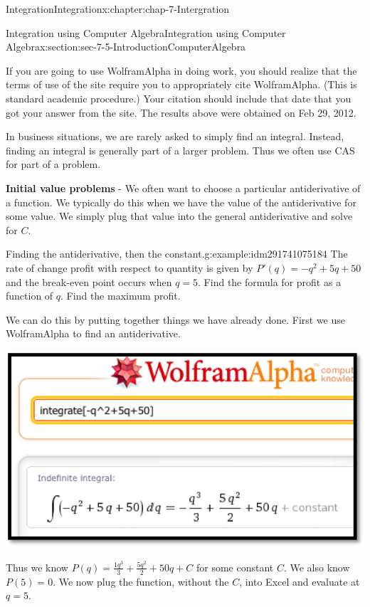 \documentclass[oneside,10pt,]{book}
\newcommand{\terminology}[1]{\textbf{#1}}
\numberwithin{equation}{section}
\begin{document}
\begin{chapterptx}{Integration}{}{Integration}{}{}{x:chapter:chap-7-Intergration}
\begin{sectionptx}{Integration using Computer Algebra}{}{Integration using Computer Algebra}{}{}{x:section:sec-7-5-IntroductionComputerAlgebra}
\par
If you are going to use Wolfram\textbar{}Alpha in doing work, you should realize that the terms of use of the site require you to appropriately cite Wolfram\textbar{}Alpha.  (This is standard academic procedure.)  Your citation should include that date that you got your answer from the site.  The results above were obtained on Feb 29, 2012.%
\par
In business situations, we are rarely asked to simply find an integral.  Instead, finding an integral is generally part of a larger problem.  Thus we often use CAS for part of a problem.%
\par
\terminology{Initial value problems} - We often want to choose a particular antiderivative of a function.  We typically do this when we have the value of the antiderivative for some value.  We simply plug that value into the general antiderivative and solve for \(C\).%
\begin{example}{Finding the antiderivative, then the constant.}{g:example:idm291741075184}%
The rate of change profit with respect to quantity is given by \(P' (q)=-q^2+5q+50\) and the break-even point occurs when \(q=5\).  Find the formula for profit as a function of \(q\).  Find the maximum profit.%
\par
We can do this by putting together things we have already done.  First we use Wolfram\textbar{}Alpha to find an antiderivative.%
\begin{sidebyside}{1}{0.15}{0.15}{0}%
\begin{sbspanel}{0.7}%
\includegraphics[width=\linewidth]{images/sec7-5-14.png}
\end{sbspanel}%
\end{sidebyside}%
\par
Thus we know \(P(q)=\frac{1q^3}{3}+\frac{5q^2}{2}+50q+C\) for some constant \(C\).  We also know \(P(5)=0\).  We now plug the function, without the \(C\), into Excel and evaluate at \(q=5\).%

\end{example}
\end{sectionptx}
\end{chapterptx}
\end{document}
